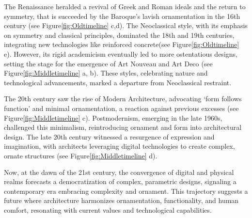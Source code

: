 The Renaissance heralded a revival of Greek and Roman ideals and the return to symmetry, that is succeeded by the Baroque's lavish ornamentation in the 16th century\cite{Economakis2023} (see Figure\ref{fig:Oldtimeline} c,d).
The Neoclassical style, with its emphasis on symmetry and classical principles, dominated the 18th and 19th centuries, integrating new technologies like reinforced concrete\cite{Economakis2023}(see Figure\ref{fig:Oldtimeline} e).
However, its rigid academicism eventually led to more ostentatious designs, setting the stage for the emergence of Art Nouveau and Art Deco (see Figure\ref{fig:Middletimeline} a, b).
These styles, celebrating nature and technological advancements, marked a departure from Neoclassical restraint\cite{Salas2018, Arora2023}.

The 20th century saw the rise of Modern Architecture, advocating `form follows function' and minimal ornamentation, a reaction against previous excesses\cite{Gage2015, Venturi1972} (see Figure\ref{fig:Middletimeline} c).
Postmodernism, emerging in the late 1960s, challenged this minimalism, reintroducing ornament and form into architectural design.
The late 20th century witnessed a resurgence of expression and imagination, with architects leveraging digital technologies to create complex, ornate structures\cite{Burlando2019} (see Figure\ref{fig:Middletimeline} d).

Now, at the dawn of the 21st century, the convergence of digital and physical realms forecasts a democratization of complex, parametric designs, signaling a contemporary era embracing complexity and ornament\cite{Schwab2016}.
This trajectory suggests a future where architecture harmonizes ornamentation, functionality, and human comfort, resonating with current values and technological capabilities.


